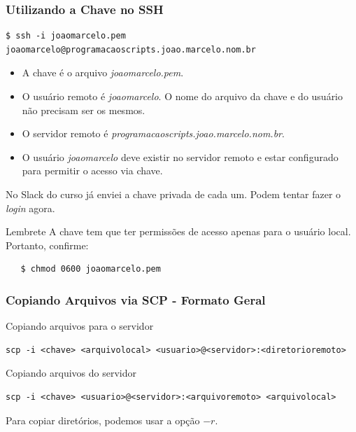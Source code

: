 \documentclass{beamer}
\begin{document}
\begin{frame}[fragile]
   \frametitle{Utilizando a Chave no SSH}
   \scriptsize
   \begin{verbatim}
$ ssh -i joaomarcelo.pem joaomarcelo@programacaoscripts.joao.marcelo.nom.br   
   \end{verbatim}
   \normalsize
   \begin{itemize}
      \item A chave é o arquivo \textit{joaomarcelo.pem}.
      \item O usuário remoto é \textit{joaomarcelo}. O nome do arquivo da chave e do usuário não precisam ser os mesmos.
      \item O servidor remoto é \textit{programacaoscripts.joao.marcelo.nom.br}.
      \item O usuário \textit{joaomarcelo} deve existir no servidor remoto e estar configurado para permitir o acesso via chave.
   \end{itemize}
   No Slack do curso já enviei a chave privada de cada um. Podem tentar fazer o \textit{login} agora.
   \begin{block}{Lembrete}
   A chave tem que ter permissões de acesso apenas para o usuário local. Portanto, confirme:
   \begin{verbatim}
   $ chmod 0600 joaomarcelo.pem
   \end{verbatim}
   \end{block}
\end{frame}

\begin{frame}[fragile]
   \frametitle{Copiando Arquivos via SCP - Formato Geral}
   \small
   \begin{block}{Copiando arquivos para o servidor}
   \scriptsize
   \begin{verbatim}
scp -i <chave> <arquivolocal> <usuario>@<servidor>:<diretorioremoto>
   \end{verbatim}
   \end{block}
   \normalsize
   \begin{block}{Copiando arquivos do servidor}
   \scriptsize
   \begin{verbatim}
scp -i <chave> <usuario>@<servidor>:<arquivoremoto> <arquivolocal>
   \end{verbatim}
   \end{block}
   Para copiar diretórios, podemos usar a opção $-r$.
\end{frame}
\end{document}

